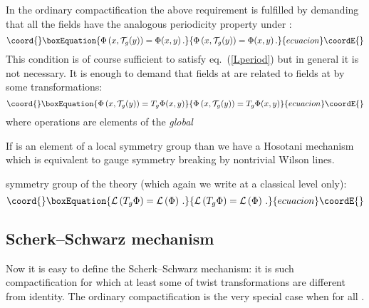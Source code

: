 \documentclass[a4paper,12pt]{article}
\def\cL{{\cal L}}
\def\cT{{\cal T}}
\def\id{{\,\,{\rm l}\!\!\!1}}
\begin{document}
In the ordinary compactification the above requirement is fulfilled by 
demanding that all the fields have the analogous periodicity property
under \myHighlight{$\cT_g$}\coordHE{}: 
\begin{equation}\coord{}\boxEquation{
\Phi\left(x,\cT_g(y)\right)=\Phi(x,y)
\,.
}{
\Phi\left(x,\cT_g(y)\right)=\Phi(x,y)
\,.
}{ecuacion}\coordE{}\end{equation}
This condition is of course sufficient to satisfy eq.\ (\ref{Lperiod})
but in general it is not necessary. It is enough to demand that
fields at \myHighlight{$\cT_g(y)$}\coordHE{} are related to fields at \coordHE{} by some
transformations: 
\begin{equation}\coord{}\boxEquation{
\Phi\left(x,\cT_g(y)\right)=T_g\Phi(x,y)
\label{PhiPeriod}
}{
\Phi\left(x,\cT_g(y)\right)=T_g\Phi(x,y)
}{ecuacion}\coordE{}\end{equation}
where operations \coordHE{} are elements of the 
{\it global}\myHighlight{$\,\,$}\coordHE{}\begin{footnote}
{If \coordHE{} is an element of a local symmetry group than we have a
Hosotani mechanism 
\cite{Hosotani:1983xw,Hosotani:1988bm} 
which is equivalent to gauge symmetry breaking by
nontrivial Wilson lines.}
\end{footnote}\myHighlight{$\!$}\coordHE{}
symmetry group of the theory (which again we write at a classical level
only):
\begin{equation}\coord{}\boxEquation{
\cL\left(T_g\Phi\right)=\cL\left(\Phi\right)
\,.
\label{PhiSS}
}{
\cL\left(T_g\Phi\right)=\cL\left(\Phi\right)
\,.
}{ecuacion}\coordE{}\end{equation}




\subsection{Scherk--Schwarz mechanism}


Now it is easy to define the Scherk--Schwarz mechanism: it is
such compactification for which at least some of twist transformations
\coordHE{} are different from identity. The ordinary compactification is
the very special case when \myHighlight{$T_g=\id$}\coordHE{} for all \coordHE{}.
\end{document}
